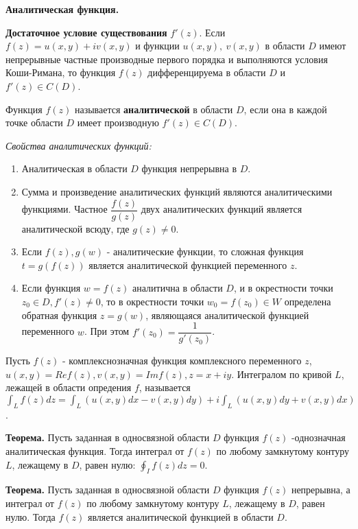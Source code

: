 \textbf{Аналитическая функция.}

\textbf{Достаточное условие существования} $f'(z)$.
Если $f(z) = u(x, y) + iv(x, y)$ и функции $u(x, y),~v(x, y)$ в области $D$ имеют непрерывные частные производные первого порядка и выполняются условия Коши-Римана, то функция $f(z)$ дифференцируема в области $D$ и $f'(z) \in C(D)$.

Функция $f(z)$ называется \textbf{аналитической} в области $D$, если она в каждой точке области $D$ имеет производную $f'(z) \in C(D)$.

\textit{Свойства аналитических функций:}
\begin{enumerate}
    \item Аналитическая в области $D$ функция непрерывна в $D$.
    \item Сумма и произведение аналитических функций являются аналитическими функциями. Частное $\dfrac{f(z)}{g(z)}$ двух аналитических функций является аналитической всюду, где $g(z) \neq 0$.
    \item Если $f(z), g(w)$ - аналитические функции, то сложная функция $t = g(f(z))$ является аналитической функцией переменного $z$.
    \item Если функция $w=f(z)$ аналитична в области $D$, и в окрестности точки $z_0 \in D, f'(z) \neq 0$, то в окрестности точки $w_0 = f(z_0) \in W$ определена обратная функция $z=g(w)$, являющаяся аналитической функцией переменного $w$. При этом $f'(z_0) = \dfrac{1}{g'(z_0)}$.
\end{enumerate}

Пусть $f(z)$ - комплекснозначная функция комплексного переменного $z$, $u(x,y) = Re f(z), v(x, y) = Im f(z), z = x + iy$. Интегралом по кривой $L$, лежащей в области опредения $f$, называется $\int_L f(z) dz = \int_L (u(x,y) dx - v(x, y) dy) + i \int_L (u(x,y) dy + v(x, y) dx)$.

\textbf{Теорема.}
Пусть заданная в односвязной области $D$ функция $f(z)$ -однозначная аналитическая функция. Тогда интеграл от $f(z)$ по любому замкнутому контуру $L$, лежащему в $D$, равен нулю: $\oint_I f(z) dz = 0$.

\textbf{Теорема.}
Пусть заданная в односвязной области $D$ функция $f(z)$ непрерывна, а интеграл от $f(z)$ по любому замкнутому контуру $L$, лежащему в $D$, равен нулю. Тогда $f(z)$ является аналитической функцией в области $D$.
